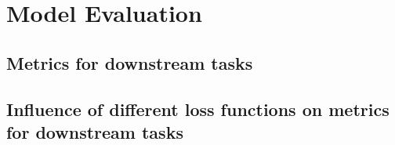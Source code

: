 \section{Model Evaluation}
    \subsection{Metrics for downstream tasks}
        
    \subsection{Influence of different loss functions on metrics for downstream tasks}
